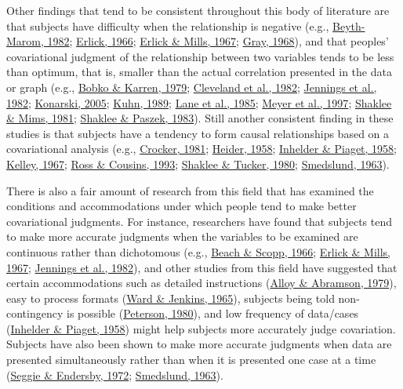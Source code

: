 \documentclass[11pt]{umnthesis}
\begin{document}
Other findings that tend to be consistent throughout this body of literature are that subjects have difficulty when the relationship is negative (e.g., \protect\hyperlink{ref-beyth-marom:1982}{Beyth-Marom, 1982}; \protect\hyperlink{ref-erlick:1966}{Erlick, 1966}; \protect\hyperlink{ref-erlick:1967}{Erlick \& Mills, 1967}; \protect\hyperlink{ref-gray:1968}{Gray, 1968}), and that peoples' covariational judgment of the relationship between two variables tends to be less than optimum, that is, smaller than the actual correlation presented in the data or graph (e.g., \protect\hyperlink{ref-bobko:1979}{Bobko \& Karren, 1979}; \protect\hyperlink{ref-cleveland:1982}{Cleveland et al., 1982}; \protect\hyperlink{ref-jennings:1982}{Jennings et al., 1982}; \protect\hyperlink{ref-konarski:2005}{Konarski, 2005}; \protect\hyperlink{ref-kuhn:1989}{Kuhn, 1989}; \protect\hyperlink{ref-lane:1985}{Lane et al., 1985}; \protect\hyperlink{ref-meyer:1997}{Meyer et al., 1997}; \protect\hyperlink{ref-shaklee:1981}{Shaklee \& Mims, 1981}; \protect\hyperlink{ref-shaklee:1983}{Shaklee \& Paszek, 1983}). Still another consistent finding in these studies is that subjects have a tendency to form causal relationships based on a covariational analysis (e.g., \protect\hyperlink{ref-crocker:1981}{Crocker, 1981}; \protect\hyperlink{ref-heider:1958}{Heider, 1958}; \protect\hyperlink{ref-inhelder:1958}{Inhelder \& Piaget, 1958}; \protect\hyperlink{ref-kelley:1967}{Kelley, 1967}; \protect\hyperlink{ref-ross:1993}{Ross \& Cousins, 1993}; \protect\hyperlink{ref-shaklee:1980}{Shaklee \& Tucker, 1980}; \protect\hyperlink{ref-smedslund:1963}{Smedslund, 1963}).

There is also a fair amount of research from this field that has examined the conditions and accommodations under which people tend to make better covariational judgments. For instance, researchers have found that subjects tend to make more accurate judgments when the variables to be examined are continuous rather than dichotomous (e.g., \protect\hyperlink{ref-beach:1966}{Beach \& Scopp, 1966}; \protect\hyperlink{ref-erlick:1967}{Erlick \& Mills, 1967}; \protect\hyperlink{ref-jennings:1982}{Jennings et al., 1982}), and other studies from this field have suggested that certain accommodations such as detailed instructions (\protect\hyperlink{ref-alloy:1979}{Alloy \& Abramson, 1979}), easy to process formats (\protect\hyperlink{ref-ward:1965}{Ward \& Jenkins, 1965}), subjects being told non-contingency is possible (\protect\hyperlink{ref-peterson:1980}{Peterson, 1980}), and low frequency of data/cases (\protect\hyperlink{ref-inhelder:1958}{Inhelder \& Piaget, 1958}) might help subjects more accurately judge covariation. Subjects have also been shown to make more accurate judgments when data are presented simultaneously rather than when it is presented one case at a time (\protect\hyperlink{ref-seggie:1972}{Seggie \& Endersby, 1972}; \protect\hyperlink{ref-smedslund:1963}{Smedslund, 1963}).
\end{document}
